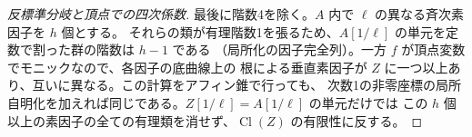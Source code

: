 \begin{proof}[反標準分岐と頂点での四次係数]
最後に階数4を除く。$A$ 内で $\ell$ の異なる斉次素因子を $h$ 個とする。
それらの類が有理階数1を張るため、$A[1/\ell]$ の単元を定数で割った群の階数は $h-1$ である
（局所化の因子完全列）。一方 $f$ が頂点変数でモニックなので、各因子の底曲線上の
根による垂直素因子が $Z$ に一つ以上あり、互いに異なる。この計算をアフィン錐で行っても、
次数1の非零座標の局所自明化を加えれば同じである。$Z[1/\ell]=A[1/\ell]$ の単元だけでは
この $h$ 個以上の素因子の全ての有理類を消せず、$\operatorname{Cl}(Z)$ の有限性に反する。
\end{proof}

